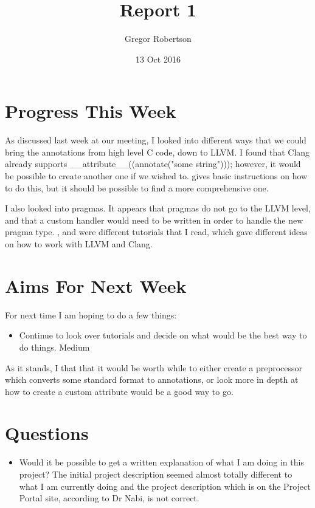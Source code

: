 \documentclass{article}
\title{Report 1}
\author{Gregor Robertson}
\date{13 Oct 2016}
\begin{document}
 
\maketitle
 
\section*{Progress This Week}
As discussed last week at our meeting, I looked into different ways that we could bring the annotations from high level C code, down to LLVM. I found that Clang already supports \_\_attribute\_\_((annotate("some string"))); however, it would be possible to create another one if we wished to. \cite{AddAnAttribute} gives basic instructions on how to do this, but it should be possible to find a more comprehensive one.

I also looked into pragmas. It appears that pragmas do not go to the LLVM level, and that a custom handler would need to be written in order to handle the new pragma type. \cite{ImplementingACustomDirectiveHandlerInClang}, \cite{WritingAnLLVMPass} and \cite{BoosClangTutorial} were different tutorials that I read, which gave different ideas on how to work with LLVM and Clang.

\section*{Aims For Next Week}
For next time I am hoping to do a few things:
\begin{itemize}
	\item Continue to look over tutorials and decide on what would be the best way to do things. \colorbox{BurntOrange}{\color{Black}Medium}
\end{itemize} 

As it stands, I that that it would be worth while to either create a preprocessor which converts some standard format to annotations, or look more in depth at how to create a custom attribute would be a good way to go.

\section*{Questions}
\begin{itemize}
	\item Would it be possible to get a written explanation of what I am doing in this project? The initial project description seemed almost totally different to what I am currently doing and the project description which is on the Project Portal site, according to Dr Nabi, is not correct.
\end{itemize}

\medskip
 
\printbibliography
\end{document}

